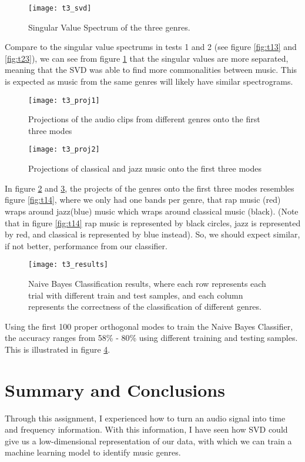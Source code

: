 \documentclass[12pt, a4paper]{article}
\begin{document}
\begin{figure}[H]
\centering
\texttt{[image: t3\_svd]}
\caption{Singular Value Spectrum of the three genres.}
\label{fig:t33}
\end{figure}
Compare to the singular value spectrums in tests 1 and 2 (see figure \ref{fig:t13} and \ref{fig:t23}), we can see from figure \ref{fig:t33} that the singular values are more separated, meaning that the SVD was able to find more commonalities between music. This is expected as music from the same genres will likely have similar spectrograms.

\begin{figure}[H]
\centering
\texttt{[image: t3\_proj1]}
\caption{Projections of the audio clips from different genres onto the first three modes}
\label{fig:t34}
\end{figure}

\begin{figure}[H]
\centering
\texttt{[image: t3\_proj2]}
\caption{Projections of classical and jazz music onto the first three modes}
\label{fig:t35}
\end{figure}

In figure \ref{fig:t34} and \ref{fig:t35}, the projects of the genres onto the first three modes resembles figure \ref{fig:t14}, where we only had one bands per genre, that rap music (red) wraps around jazz(blue) music which wraps around classical music (black). (Note that in figure \ref{fig:t14} rap music is represented by black circles, jazz is represented by red, and classical is represented by blue instead). So, we should expect similar, if not better, performance from our classifier.

\begin{figure}[H]
\centering
\texttt{[image: t3\_results]}
\caption{Naive Bayes Classification results, where each row represents each trial with different train and test samples, and each column represents the correctness of the classification of different genres.}
\label{fig:t36}
\end{figure}
Using the first 100 proper orthogonal modes to train the Naive Bayes Classifier, the accuracy ranges from 58\% - 80\% using different training and testing samples. This is illustrated in figure \ref{fig:t36}.


\section{Summary and Conclusions}
Through this assignment, I experienced how to turn an audio signal into time and frequency information. With this information, I have seen how SVD could give us a low-dimensional representation of our data, with which we can train a machine learning model to identify music genres.
\end{document}
